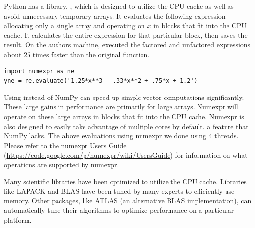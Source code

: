 Python has a library, , which is designed to utilize the CPU cache as well as avoid unnecessary temporary arrays.
It evaluates the following expression allocating only a single array and operating on $x$ in blocks that fit into the CPU cache.
It calculates the entire expression for that particular block, then saves the result.
On the authors machine,  executed the factored and unfactored expressions about 25 times faster than the original function.
\begin{lstlisting}
import numexpr as ne
yne = ne.evaluate('1.25*x**3 - .33*x**2 + .75*x + 1.2')
\end{lstlisting}
Using  instead of NumPy can speed up simple vector computations significantly.
These large gains in performance are primarily for large arrays.
Numexpr will operate on these large arrays in blocks that fit into the CPU cache.
Numexpr is also designed to easily take advantage of multiple cores by default, a feature that NumPy lacks.
The above evaluations using numexpr we done using 4 threads.
Please refer to the numexpr Users Guide (\url{https://code.google.com/p/numexpr/wiki/UsersGuide}) for information on what operations are supported by numexpr.

Many scientific libraries have been optimized to utilize the CPU cache.
Libraries like LAPACK and BLAS have been tuned by many experts to efficiently use memory.
Other packages, like ATLAS (an alternative BLAS implementation), can automatically tune their algorithms to optimize performance on a particular platform.